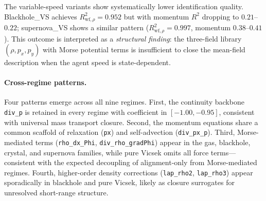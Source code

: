The variable-speed variants show systematically lower identification
quality.  Blackhole\_VS achieves $R^2_{\text{wf},\rho}=0.952$ but with
momentum $R^2$ dropping to $0.21$--$0.22$; supernova\_VS shows a similar
pattern ($R^2_{\text{wf},\rho}=0.997$, momentum $0.38$--$0.41$).
This outcome is interpreted as a \emph{structural finding}: the three-field
library $(\rho, p_x, p_y)$ with Morse potential terms is insufficient to
close the mean-field description when the agent speed is state-dependent.

\paragraph{Cross-regime patterns.}
\label{subsec:outcomes_patterns}

Four patterns emerge across all nine regimes.
First, the continuity backbone \texttt{div\_p} is retained in
every regime with coefficient in $[-1.00, -0.95]$, consistent with
universal mass transport closure.
Second, the momentum equations share a common scaffold of
relaxation (\texttt{px}) and self-advection (\texttt{div\_px\_p}).
Third, Morse-mediated terms (\texttt{rho\_dx\_Phi},
\texttt{div\_rho\_gradPhi}) appear in the gas, blackhole, crystal, and
supernova families, while pure Vicsek omits all force terms---consistent
with the expected decoupling of alignment-only from Morse-mediated regimes.
Fourth, higher-order density corrections (\texttt{lap\_rho2},
\texttt{lap\_rho3}) appear sporadically in blackhole and pure Vicsek,
likely as closure surrogates for unresolved short-range structure.
